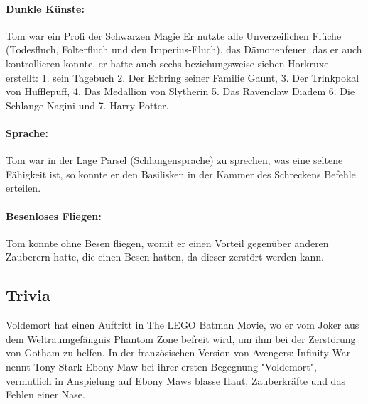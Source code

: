 \documentclass[a4paper, 10pt]{article}
\begin{document}
\paragraph{Dunkle Künste:} 
Tom war ein Profi der Schwarzen Magie Er nutzte alle Unverzeilichen Flüche (Todesfluch, Folterfluch und den Imperius-Fluch), das Dämonenfeuer, das er auch kontrollieren konnte, er hatte auch sechs beziehungsweise sieben Horkruxe erstellt: 1. sein Tagebuch 2. Der Erbring seiner Familie Gaunt, 3. Der Trinkpokal von Hufflepuff, 4. Das Medallion von Slytherin 5. Das Ravenclaw Diadem 6. Die Schlange Nagini und 7. Harry Potter.
\paragraph{Sprache:}  
Tom war in der Lage Parsel (Schlangensprache) zu sprechen, was eine seltene Fähigkeit ist, so konnte er den Basilisken in der Kammer des Schreckens Befehle erteilen.
\paragraph{Besenloses Fliegen:} 
Tom konnte ohne Besen fliegen, womit er einen Vorteil gegenüber anderen Zauberern hatte, die einen Besen hatten, da dieser zerstört werden kann.

\subsection*{\Large Trivia}
Voldemort hat einen Auftritt in The LEGO Batman Movie, wo er vom Joker aus dem Weltraumgefängnis Phantom Zone befreit wird, um ihm bei der Zerstörung von Gotham zu helfen.
In der französischen Version von Avengers: Infinity War nennt Tony Stark Ebony Maw bei ihrer ersten Begegnung "Voldemort", vermutlich in Anspielung auf Ebony Maws blasse Haut, Zauberkräfte und das Fehlen einer Nase.
\end{document}
